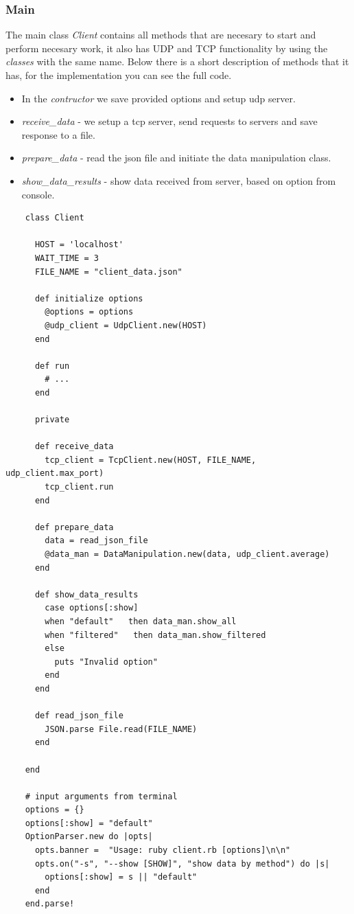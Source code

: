 \documentclass[12pt]{article}
\begin{document}
    \subsubsection{Main}

    The main class \textit{Client} contains all methods that are necesary to start and perform necesary
    work, it also has UDP and TCP functionality by using the  \textit{classes} with the same name.
    Below there is a short description of methods that it has, for the implementation you can see the full code.

    \begin{itemize}
      \renewcommand{\labelitemi}{$\circ$}
      \item In the \textit{contructor} we save provided options and setup udp server.
      \item  \textit{receive\_data} - we setup a tcp server, send requests to servers and save response to a file.
      \item \textit{prepare\_data} - read the json file and initiate the data manipulation class.
      \item \textit{show\_data\_results} - show data received from server, based on option from console.
    \end{itemize}

    \begin{lstlisting}
    class Client

      HOST = 'localhost'
      WAIT_TIME = 3
      FILE_NAME = "client_data.json"

      def initialize options
        @options = options
        @udp_client = UdpClient.new(HOST)
      end

      def run
        # ...
      end

      private

      def receive_data
        tcp_client = TcpClient.new(HOST, FILE_NAME, udp_client.max_port)
        tcp_client.run
      end

      def prepare_data
        data = read_json_file
        @data_man = DataManipulation.new(data, udp_client.average)
      end

      def show_data_results
        case options[:show]
        when "default"   then data_man.show_all
        when "filtered"   then data_man.show_filtered
        else
          puts "Invalid option"
        end
      end

      def read_json_file
        JSON.parse File.read(FILE_NAME)
      end

    end

    # input arguments from terminal
    options = {}
    options[:show] = "default"
    OptionParser.new do |opts|
      opts.banner =  "Usage: ruby client.rb [options]\n\n"
      opts.on("-s", "--show [SHOW]", "show data by method") do |s|
        options[:show] = s || "default"
      end
    end.parse!
    \end{lstlisting}
\end{document}
